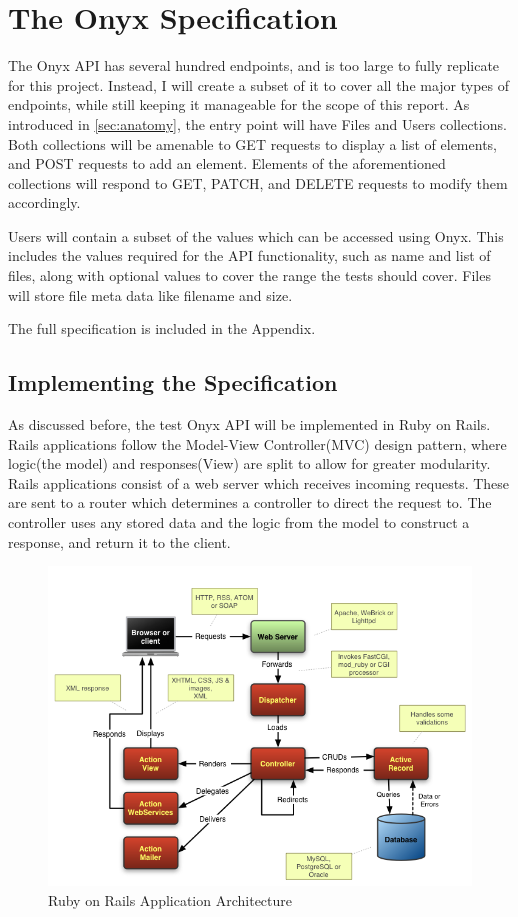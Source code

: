\section{The Onyx Specification}

The Onyx API has several hundred endpoints, and is too large to fully replicate for this project. Instead, I will create a subset of it to cover all the major types of endpoints, while still keeping it manageable for the scope of this report. As introduced in \ref{sec:anatomy}, the entry point will have Files and Users collections. Both collections will be amenable to GET requests to display a list of elements, and POST requests to add an element. Elements of the aforementioned collections will respond to GET, PATCH, and DELETE requests to modify them accordingly.

Users will contain a subset of the values which can be accessed using Onyx. This includes the values required for the API functionality, such as name and list of files, along with optional values to cover the range the tests should cover. Files will store file meta data like filename and size.

The full specification is included in the Appendix. 

\subsection{Implementing the Specification}

As discussed before, the test Onyx API will be implemented in Ruby on Rails. Rails applications follow the Model-View Controller(MVC)\cite{mvsspec} design pattern, where logic(the model) and responses(View) are split to allow for greater modularity. Rails applications consist of a web server which receives incoming requests. These are sent to a router which determines a controller to direct the request to. The controller uses any stored data and the logic from the model to construct a response, and return it to the client.

\begin{figure}[ht]
\includegraphics[width=\textwidth]{rail}
\caption{Ruby on Rails Application Architecture\cite{ror}}
\end{figure}

